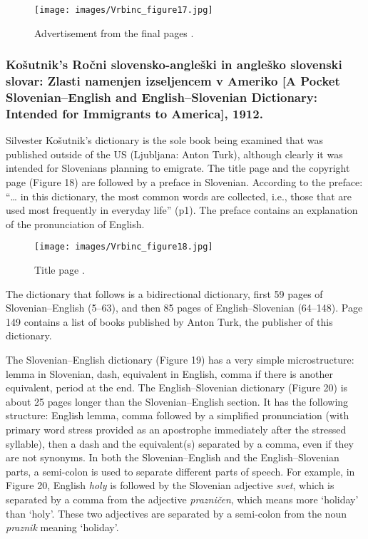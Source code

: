 \documentclass[output=paper,colorlinks,citecolor=brown,arabicfont,chinesefont]{langscibook}
\begin{document}
\begin{figure}
\texttt{[image: images/Vrbinc\_figure17.jpg]}
\caption{Advertisement from the final pages \citep{Kubelka1912b}.}
\label{Figure 17}
\end{figure}

\subsubsection{Košutnik’s Ročni slovensko-angleški in angleško slovenski slovar: Zlasti namenjen izseljencem v Ameriko [A Pocket Slovenian–English and English–Slovenian Dictionary: Intended for Immigrants to America], 1912.}

Silvester Košutnik’s dictionary is the sole book being examined that was published outside of the US (Ljubljana: Anton Turk), although clearly it was intended for Slovenians planning to emigrate. The title page and the copyright page (Figure 18) are followed by a preface in Slovenian. According to the preface: “… in this dictionary, the most common words are collected, i.e., those that are used most frequently in everyday life” (p1). The preface contains an explanation of the pronunciation of English. 


\begin{figure}
\texttt{[image: images/Vrbinc\_figure18.jpg]}
\caption{{Title page \citep{Kosutnik1912}.}}
\label{Figure 18}
\end{figure}

The dictionary that follows is a bidirectional dictionary, first 59 pages of Slovenian–English (5–63), and then 85 pages of English–Slovenian (64–148). Page 149 contains a list of books published by Anton Turk, the publisher of this dictionary.

The Slovenian–English dictionary (Figure 19) has a very simple microstructure: lemma in Slovenian, dash, equivalent in English, comma if there is another equivalent, period at the end. The English–Slovenian dictionary (Figure 20) is about 25 pages longer than the Slovenian–English section. It has the following structure: English lemma, comma followed by a simplified pronunciation (with primary word stress provided as an apostrophe immediately after the stressed syllable), then a dash and the equivalent(s) separated by a comma, even if they are not synonyms. In both the Slovenian–English and the English–Slovenian parts, a semi-colon is used to separate different parts of speech. For example, in Figure 20, English \emph{holy} is followed by the Slovenian adjective \emph{svet}, which is separated by a comma from the adjective \emph{prazničen}, which means more ‘holiday’ than ‘holy’. These two adjectives are separated by a semi-colon from the noun \emph{praznik} meaning ‘holiday’. 
\end{document}
